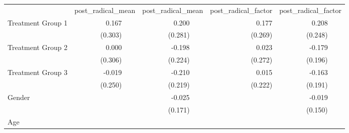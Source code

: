 \documentclass{article}
\begin{document}
\begin{table}[!h]
\centering
\begin{tabular}{llllllll}
\cline{1-8}
\multicolumn{1}{r}{} &
  \multicolumn{2}{c}{post\_radical\_mean} &
  \multicolumn{2}{c}{post\_radical\_mean} &
  \multicolumn{1}{c}{post\_radical\_factor} &
  \multicolumn{2}{c}{post\_radical\_factor} \\
\cline{1-8}
\multicolumn{1}{l}{Treatment Group 1} &
  \multicolumn{1}{r}{0.167} &
  \multicolumn{1}{l}{} &
  \multicolumn{1}{r}{0.200} &
  \multicolumn{1}{l}{} &
  \multicolumn{1}{r}{0.177} &
  \multicolumn{1}{r}{0.208} &
  \multicolumn{1}{l}{} \\
\multicolumn{1}{l}{} &
  \multicolumn{1}{r}{(0.303)} &
  \multicolumn{1}{l}{} &
  \multicolumn{1}{r}{(0.281)} &
  \multicolumn{1}{l}{} &
  \multicolumn{1}{r}{(0.269)} &
  \multicolumn{1}{r}{(0.248)} &
  \multicolumn{1}{l}{} \\
\multicolumn{1}{l}{Treatment Group 2} &
  \multicolumn{1}{r}{0.000} &
  \multicolumn{1}{l}{} &
  \multicolumn{1}{r}{-0.198} &
  \multicolumn{1}{l}{} &
  \multicolumn{1}{r}{0.023} &
  \multicolumn{1}{r}{-0.179} &
  \multicolumn{1}{l}{} \\
\multicolumn{1}{l}{} &
  \multicolumn{1}{r}{(0.306)} &
  \multicolumn{1}{l}{} &
  \multicolumn{1}{r}{(0.224)} &
  \multicolumn{1}{l}{} &
  \multicolumn{1}{r}{(0.272)} &
  \multicolumn{1}{r}{(0.196)} &
  \multicolumn{1}{l}{} \\
\multicolumn{1}{l}{Treatment Group 3} &
  \multicolumn{1}{r}{-0.019} &
  \multicolumn{1}{l}{} &
  \multicolumn{1}{r}{-0.210} &
  \multicolumn{1}{l}{} &
  \multicolumn{1}{r}{0.015} &
  \multicolumn{1}{r}{-0.163} &
  \multicolumn{1}{l}{} \\
\multicolumn{1}{l}{} &
  \multicolumn{1}{r}{(0.250)} &
  \multicolumn{1}{l}{} &
  \multicolumn{1}{r}{(0.219)} &
  \multicolumn{1}{l}{} &
  \multicolumn{1}{r}{(0.222)} &
  \multicolumn{1}{r}{(0.191)} &
  \multicolumn{1}{l}{} \\
\multicolumn{1}{l}{Gender} &
  \multicolumn{1}{r}{} &
  \multicolumn{1}{l}{} &
  \multicolumn{1}{r}{-0.025} &
  \multicolumn{1}{l}{} &
  \multicolumn{1}{r}{} &
  \multicolumn{1}{r}{-0.019} &
  \multicolumn{1}{l}{} \\
\multicolumn{1}{l}{} &
  \multicolumn{1}{r}{} &
  \multicolumn{1}{l}{} &
  \multicolumn{1}{r}{(0.171)} &
  \multicolumn{1}{l}{} &
  \multicolumn{1}{r}{} &
  \multicolumn{1}{r}{(0.150)} &
  \multicolumn{1}{l}{} \\
\multicolumn{1}{l}{Age} &
  \multicolumn{1}{r}{} &
  \multicolumn{1}{l}{} &

\end{tabular}
\end{table}
\end{document}
